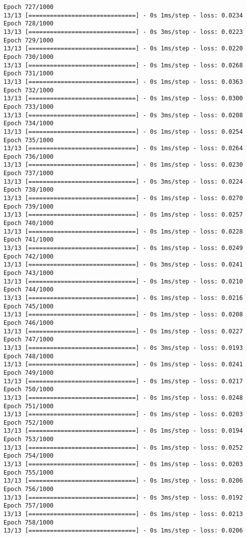 \documentclass[11pt]{article}
\begin{document}
\begin{Verbatim}[commandchars=\\\{\}]
Epoch 727/1000
13/13 [==============================] - 0s 1ms/step - loss: 0.0234
Epoch 728/1000
13/13 [==============================] - 0s 3ms/step - loss: 0.0223
Epoch 729/1000
13/13 [==============================] - 0s 1ms/step - loss: 0.0220
Epoch 730/1000
13/13 [==============================] - 0s 1ms/step - loss: 0.0268
Epoch 731/1000
13/13 [==============================] - 0s 1ms/step - loss: 0.0363
Epoch 732/1000
13/13 [==============================] - 0s 1ms/step - loss: 0.0300
Epoch 733/1000
13/13 [==============================] - 0s 3ms/step - loss: 0.0208
Epoch 734/1000
13/13 [==============================] - 0s 1ms/step - loss: 0.0254
Epoch 735/1000
13/13 [==============================] - 0s 1ms/step - loss: 0.0264
Epoch 736/1000
13/13 [==============================] - 0s 1ms/step - loss: 0.0230
Epoch 737/1000
13/13 [==============================] - 0s 3ms/step - loss: 0.0224
Epoch 738/1000
13/13 [==============================] - 0s 1ms/step - loss: 0.0270
Epoch 739/1000
13/13 [==============================] - 0s 1ms/step - loss: 0.0257
Epoch 740/1000
13/13 [==============================] - 0s 1ms/step - loss: 0.0228
Epoch 741/1000
13/13 [==============================] - 0s 1ms/step - loss: 0.0249
Epoch 742/1000
13/13 [==============================] - 0s 3ms/step - loss: 0.0241
Epoch 743/1000
13/13 [==============================] - 0s 1ms/step - loss: 0.0210
Epoch 744/1000
13/13 [==============================] - 0s 1ms/step - loss: 0.0216
Epoch 745/1000
13/13 [==============================] - 0s 1ms/step - loss: 0.0208
Epoch 746/1000
13/13 [==============================] - 0s 1ms/step - loss: 0.0227
Epoch 747/1000
13/13 [==============================] - 0s 3ms/step - loss: 0.0193
Epoch 748/1000
13/13 [==============================] - 0s 1ms/step - loss: 0.0241
Epoch 749/1000
13/13 [==============================] - 0s 1ms/step - loss: 0.0217
Epoch 750/1000
13/13 [==============================] - 0s 1ms/step - loss: 0.0248
Epoch 751/1000
13/13 [==============================] - 0s 1ms/step - loss: 0.0203
Epoch 752/1000
13/13 [==============================] - 0s 1ms/step - loss: 0.0194
Epoch 753/1000
13/13 [==============================] - 0s 1ms/step - loss: 0.0252
Epoch 754/1000
13/13 [==============================] - 0s 1ms/step - loss: 0.0203
Epoch 755/1000
13/13 [==============================] - 0s 1ms/step - loss: 0.0206
Epoch 756/1000
13/13 [==============================] - 0s 3ms/step - loss: 0.0192
Epoch 757/1000
13/13 [==============================] - 0s 1ms/step - loss: 0.0213
Epoch 758/1000
13/13 [==============================] - 0s 1ms/step - loss: 0.0206

\end{Verbatim}
\end{document}
